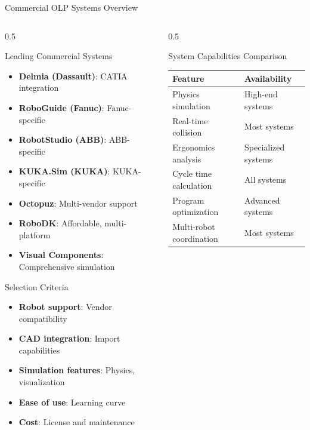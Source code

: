 \documentclass[10pt,aspectratio=169]{beamer}
\begin{document}
\begin{frame}{Commercial OLP Systems Overview}
\begin{columns}[T]
\begin{column}{0.5\textwidth}
\begin{block}{Leading Commercial Systems}
\begin{itemize}
\item \textbf{Delmia (Dassault)}: CATIA integration
\item \textbf{RoboGuide (Fanuc)}: Fanuc-specific
\item \textbf{RobotStudio (ABB)}: ABB-specific
\item \textbf{KUKA.Sim (KUKA)}: KUKA-specific
\item \textbf{Octopuz}: Multi-vendor support
\item \textbf{RoboDK}: Affordable, multi-platform
\item \textbf{Visual Components}: Comprehensive simulation
\end{itemize}
\end{block}
\begin{alertblock}{Selection Criteria}
\begin{itemize}
\item \textbf{Robot support}: Vendor compatibility
\item \textbf{CAD integration}: Import capabilities
\item \textbf{Simulation features}: Physics, visualization
\item \textbf{Ease of use}: Learning curve
\item \textbf{Cost}: License and maintenance
\end{itemize}
\end{alertblock}
\end{column}
\begin{column}{0.5\textwidth}
\begin{block}{System Capabilities Comparison}
\begin{table}
\centering
\scriptsize
\begin{tabular}{p{}p{}}
\toprule
\textbf{Feature} & \textbf{Availability} \\
\midrule
Physics simulation & High-end systems \\
Real-time collision & Most systems \\
Ergonomics analysis & Specialized systems \\
Cycle time calculation & All systems \\
Program optimization & Advanced systems \\
Multi-robot coordination & Most systems \\
\bottomrule
\end{tabular}
\end{table}
\end{block}
\end{column}
\end{columns}
\end{frame}
\end{document}
